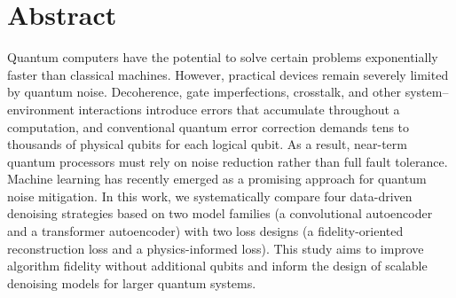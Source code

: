 \documentclass[accepted]{article}
\author{Amitav Krishna}
\date{\today}
\title{}
\begin{document}
\tableofcontents

\section{Abstract}
\label{sec:orgfe414da}
Quantum computers have the potential to solve certain problems exponentially faster than classical machines. However, practical devices remain severely limited by quantum noise. Decoherence, gate imperfections, crosstalk, and other system–environment interactions introduce errors that accumulate throughout a computation, and conventional quantum error correction demands tens to thousands of physical qubits for each logical qubit. As a result, near-term quantum processors must rely on noise reduction rather than full fault tolerance. Machine learning has recently emerged as a promising approach for quantum noise mitigation. In this work, we systematically compare four data-driven denoising strategies based on two model families (a convolutional autoencoder and a transformer autoencoder) with two loss designs (a fidelity-oriented reconstruction loss and a physics-informed loss). This study aims to improve algorithm fidelity without additional qubits and inform the design of scalable denoising models for larger quantum systems.
\end{document}
